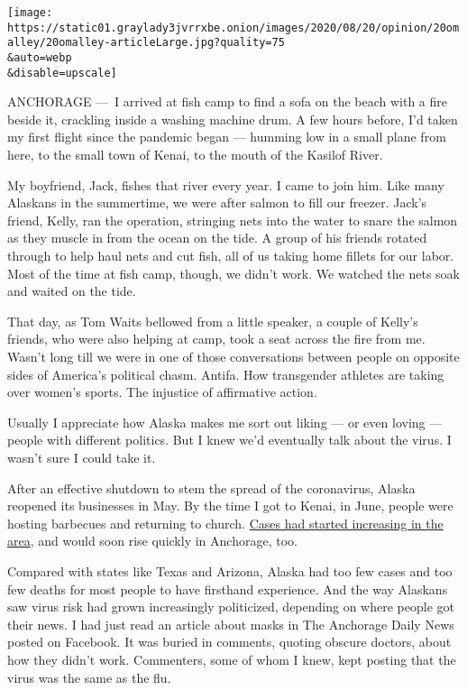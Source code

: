 \texttt{[image: https://static01.graylady3jvrrxbe.onion/images/2020/08/20/opinion/20omalley/20omalley-articleLarge.jpg?quality=75\\\&auto=webp\\\&disable=upscale]}

ANCHORAGE ---~I arrived at fish camp to find a sofa on the beach with a
fire beside it, crackling inside a washing machine drum. A few hours
before, I'd taken my first flight since the pandemic began --- humming
low in a small plane from here, to the small town of Kenai, to the mouth
of the Kasilof River.

My boyfriend, Jack, fishes that river every year. I came to join him.
Like many Alaskans in the summertime, we were after salmon to fill our
freezer. Jack's friend, Kelly, ran the operation, stringing nets into
the water to snare the salmon as they muscle in from the ocean on the
tide. A group of his friends rotated through to help haul nets and cut
fish, all of us taking home fillets for our labor. Most of the time at
fish camp, though, we didn't work. We watched the nets soak and waited
on the tide.

That day, as Tom Waits bellowed from a little speaker, a couple of
Kelly's friends, who were also helping at camp, took a seat across the
fire from me. Wasn't long till we were in one of those conversations
between people on opposite sides of America's political chasm. Antifa.
How transgender athletes are taking over women's sports. The injustice
of affirmative action.

Usually I appreciate how Alaska makes me sort out liking --- or even
loving --- people with different politics. But I knew we'd eventually
talk about the virus. I wasn't sure I could take it.

After an effective shutdown to stem the spread of the coronavirus,
Alaska reopened its businesses in May. By the time I got to Kenai, in
June, people were hosting barbecues and returning to church.
\href{https://www.alaskapublic.org/2020/06/11/as-covid-19-spikes-in-alaska-kenai-peninsula-emerges-as-virus-hotspot/}{Cases
had started increasing in the area}, and would soon rise quickly in
Anchorage, too.

Compared with states like Texas and Arizona, Alaska had too few cases
and too few deaths for most people to have firsthand experience. And the
way Alaskans saw virus risk had grown increasingly politicized,
depending on where people got their news. I had just read an article
about masks in The Anchorage Daily News posted on Facebook. It was
buried in comments, quoting obscure doctors, about how they didn't work.
Commenters, some of whom I knew, kept posting that the virus was the
same as the flu.

